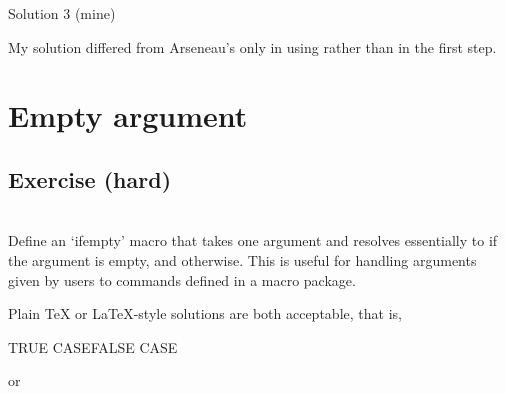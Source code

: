 \begin{solution}{Solution 3 (mine)}
\begin{lcode}
\edef\a{\b}
\expandafter\expandafter\expandafter\def
\expandafter\expandafter\expandafter\a
\expandafter\expandafter\expandafter{\expandafter\a\expandafter\c\d}
\end{lcode}
\end{solution}

My solution differed from Arseneau's only in using \cmd{\a} rather than \cmd{\e}
in the first step.

\begin{comment}
[Solution for exercise 2 moved to answer.002]
[Solution for exercise 3 moved to answer.003]

Michael Downes                mjd@math.ams.com (Internet)

\end{comment}



\chapter{Empty argument}

\section{Exercise (hard)}


\begin{comment}

[Posted to info-tex on 10 Oct 91; see exercise.001]
**********************************************************************
*** Exercise 2 (hard):
\end{comment}

\\

Define an `ifempty' macro that takes one argument and resolves
essentially to  if the argument is empty, and 
otherwise. This is useful for handling arguments given by
users to commands defined in a macro package.

Plain TeX or LaTeX-style solutions are both acceptable, that
is,
\begin{lcode}
     TRUE CASE\else FALSE CASE\fi
\end{lcode}
or
\begin{lcode}
\end{lcode}

